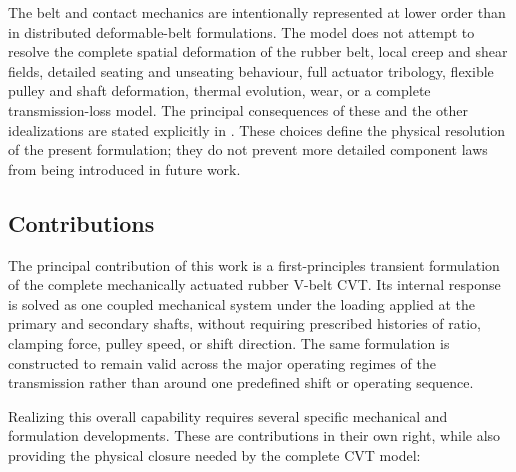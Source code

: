 \documentclass[11pt]{report}
\numberwithin{equation}{section}
\newcounter{assump}
\begin{document}
The belt and contact mechanics are intentionally represented at lower order
than in distributed deformable-belt formulations. The model does not attempt to
resolve the complete spatial deformation of the rubber belt, local creep and
shear fields, detailed seating and unseating behaviour, full actuator
tribology, flexible pulley and shaft deformation, thermal evolution, wear, or
a complete transmission-loss model. The principal consequences of these and
the other idealizations are stated explicitly in . These
choices define the physical resolution of the present formulation; they do not
prevent more detailed component laws from being introduced in future work.

\subsection{Contributions}
\label{sec:contributions}

The principal contribution of this work is a first-principles transient
formulation of the complete mechanically actuated rubber V-belt CVT. Its
internal response is solved as one coupled mechanical system under the loading
applied at the primary and secondary shafts, without
requiring prescribed histories of ratio, clamping force, pulley speed, or
shift direction. The same formulation is constructed to remain valid across
the major operating regimes of the transmission rather than around one
predefined shift or operating sequence.

Realizing this overall capability requires several specific mechanical and
formulation developments. These are contributions in their own right, while
also providing the physical closure needed by the complete CVT model:
\end{document}
